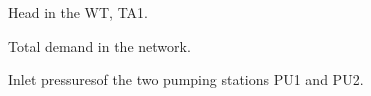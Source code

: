 \vspace{-3mm}

 \begin{figure}[H]
 \centering
  
 \vspace{-1.5mm}
 \caption{Head in the WT, TA1.}
 \label{fig:WT_head_example}
 \end{figure}

 \begin{figure}[H]
 \centering
  
 \vspace{-1.5mm}
 \caption{Total demand in the network.}
 \label{fig:sigma_example}
 \end{figure}

 \begin{figure}[H]
 \centering
  
 \vspace{-1.5mm}
 \caption{Inlet pressuresof the two pumping stations PU1 and PU2.}
 \label{fig:sigma_example}
 \end{figure}









